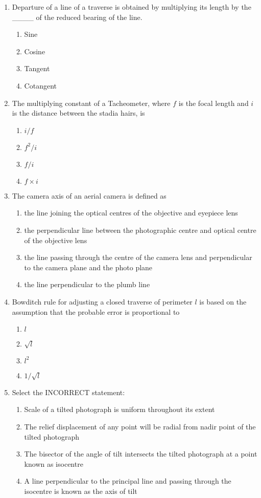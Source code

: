 \documentclass[12pt,a4paper]{article}
\begin{document}
\begin{enumerate}
\item Departure of a line of a traverse is obtained by multiplying its length by the \_\_\_\_ of the reduced bearing of the line.
\begin{enumerate}
    \item Sine
    \item Cosine
    \item Tangent
    \item Cotangent
\end{enumerate}

\item The multiplying constant of a Tacheometer, where $f$ is the focal length and $i$ is the distance between the stadia hairs, is
\begin{enumerate}
    \item $i/f$
    \item $f^2 / i$
    \item $f / i$
    \item $f \times i$
\end{enumerate}

\item The camera axis of an aerial camera is defined as
\begin{enumerate}
    \item the line joining the optical centres of the objective and eyepiece lens
    \item the perpendicular line between the photographic centre and optical centre of the objective lens
    \item the line passing through the centre of the camera lens and perpendicular to the camera plane and the photo plane
    \item the line perpendicular to the plumb line
\end{enumerate}

\item Bowditch rule for adjusting a closed traverse of perimeter $l$ is based on the assumption that the probable error is proportional to
\begin{enumerate}
    \item $l$
    \item $\sqrt{l}$
    \item $l^2$
    \item $1/\sqrt{l}$
\end{enumerate}

\item Select the INCORRECT statement:
\begin{enumerate}
    \item Scale of a tilted photograph is uniform throughout its extent
    \item The relief displacement of any point will be radial from nadir point of the tilted photograph
    \item The bisector of the angle of tilt intersects the tilted photograph at a point known as isocentre
    \item A line perpendicular to the principal line and passing through the isocentre is known as the axis of tilt
\end{enumerate}


\end{enumerate}
\end{document}
